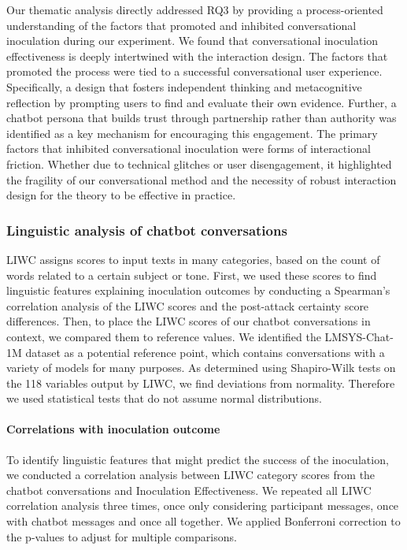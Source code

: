 \documentclass[sigconf]{acmart}
\begin{document}
Our thematic analysis directly addressed RQ3 by providing a process-oriented understanding of the factors that promoted and inhibited conversational inoculation during our experiment. We found that conversational inoculation effectiveness is deeply intertwined with the interaction design. 
The factors that promoted the process were tied to a successful conversational user experience. Specifically, a design that fosters independent thinking and metacognitive reflection by prompting users to find and evaluate their own evidence.
Further, a chatbot persona that builds trust through partnership rather than authority was identified as a key mechanism for encouraging this engagement. The primary factors that inhibited conversational inoculation were forms of interactional friction. Whether due to technical glitches or user disengagement, it highlighted the fragility of our conversational method and the necessity of robust interaction design for the theory to be effective in practice.

\subsubsection{Linguistic analysis of chatbot conversations}
 
LIWC assigns scores to input texts in many categories, based on the count of words related to a certain subject or tone. 
First, we used these scores to find linguistic features explaining inoculation outcomes by conducting a Spearman's correlation analysis of the LIWC scores and the post-attack certainty score differences. 
Then, to place the LIWC scores of our chatbot conversations in context, we compared them to reference values. We identified the LMSYS-Chat-1M dataset \cite{lmsys-chat-1m} as a potential reference point, which contains conversations with a variety of models for many purposes.  
As determined using Shapiro-Wilk tests on the 118 variables output by LIWC, we find deviations from normality. Therefore we used statistical tests that do not assume normal distributions.

\paragraph{Correlations with inoculation outcome}
\label{sec:liwc_correlation}

To identify linguistic features that might predict the success of the inoculation, we conducted a correlation analysis between LIWC category scores from the chatbot conversations and Inoculation Effectiveness. We repeated all LIWC correlation analysis three times, once only considering participant messages, once with chatbot messages and once all together. We applied Bonferroni correction to the p-values to adjust for multiple comparisons. 
\end{document}
